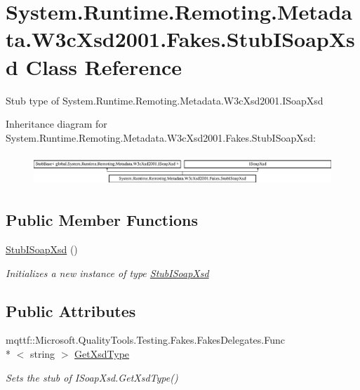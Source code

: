 \hypertarget{class_system_1_1_runtime_1_1_remoting_1_1_metadata_1_1_w3c_xsd2001_1_1_fakes_1_1_stub_i_soap_xsd}{\section{System.\-Runtime.\-Remoting.\-Metadata.\-W3c\-Xsd2001.\-Fakes.\-Stub\-I\-Soap\-Xsd Class Reference}
\label{class_system_1_1_runtime_1_1_remoting_1_1_metadata_1_1_w3c_xsd2001_1_1_fakes_1_1_stub_i_soap_xsd}
}


Stub type of System.\-Runtime.\-Remoting.\-Metadata.\-W3c\-Xsd2001.\-I\-Soap\-Xsd 


Inheritance diagram for System.\-Runtime.\-Remoting.\-Metadata.\-W3c\-Xsd2001.\-Fakes.\-Stub\-I\-Soap\-Xsd\-:\begin{figure}[H]
\begin{center}
\leavevmode
\includegraphics[height=1.188960cm]{class_system_1_1_runtime_1_1_remoting_1_1_metadata_1_1_w3c_xsd2001_1_1_fakes_1_1_stub_i_soap_xsd}
\end{center}
\end{figure}
\subsection*{Public Member Functions}
\begin{DoxyCompactItemize}
\item 
\hyperlink{class_system_1_1_runtime_1_1_remoting_1_1_metadata_1_1_w3c_xsd2001_1_1_fakes_1_1_stub_i_soap_xsd_a7b054a3ffbe07d0d683850ae5ec1f8d4}{Stub\-I\-Soap\-Xsd} ()
\begin{DoxyCompactList}\small\item\em Initializes a new instance of type \hyperlink{class_system_1_1_runtime_1_1_remoting_1_1_metadata_1_1_w3c_xsd2001_1_1_fakes_1_1_stub_i_soap_xsd}{Stub\-I\-Soap\-Xsd}\end{DoxyCompactList}\end{DoxyCompactItemize}
\subsection*{Public Attributes}
\begin{DoxyCompactItemize}
\item 
mqttf\-::\-Microsoft.\-Quality\-Tools.\-Testing.\-Fakes.\-Fakes\-Delegates.\-Func\\*
$<$ string $>$ \hyperlink{class_system_1_1_runtime_1_1_remoting_1_1_metadata_1_1_w3c_xsd2001_1_1_fakes_1_1_stub_i_soap_xsd_aaec2711aff6c42681d88e29ff8d67261}{Get\-Xsd\-Type}
\begin{DoxyCompactList}\small\item\em Sets the stub of I\-Soap\-Xsd.\-Get\-Xsd\-Type()\end{DoxyCompactList}\end{DoxyCompactItemize}


